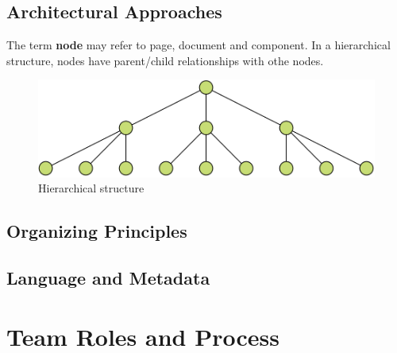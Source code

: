 \subsection{Architectural Approaches}
The term \textbf{node} may refer to page, document and component. In a hierarchical structure, nodes have parent/child relationships with othe nodes. 
\begin{figure}[]
    \centering
        \includegraphics[width=12cm]{images/pic7.png}    
    \caption{Hierarchical structure}
\end{figure}
\subsection{Organizing Principles}
\subsection{Language and Metadata}
\section{Team Roles and Process}